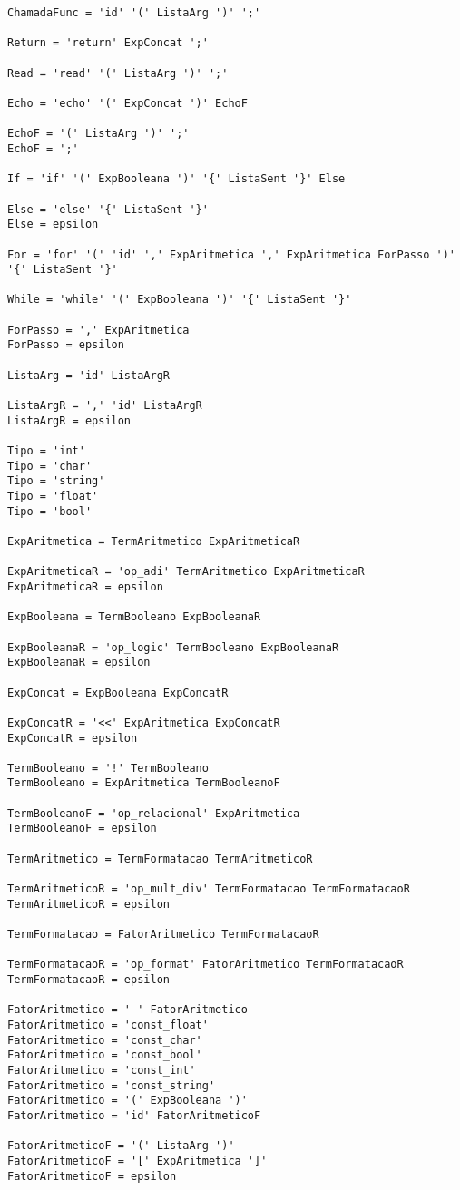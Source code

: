 \documentclass[
  12pt,				%
  oneside,			%
  a4paper,			%
  english,			%
  french,				%
  spanish,			%
  brazil,				%
]{abntex2}
\begin{document}
\begin{lstlisting}[label={code:gramatica-original},caption={Gramática
    original da linguagem de programação LisC.},style={mystyle}]
ChamadaFunc = 'id' '(' ListaArg ')' ';'

Return = 'return' ExpConcat ';'

Read = 'read' '(' ListaArg ')' ';'

Echo = 'echo' '(' ExpConcat ')' EchoF

EchoF = '(' ListaArg ')' ';'
EchoF = ';'

If = 'if' '(' ExpBooleana ')' '{' ListaSent '}' Else

Else = 'else' '{' ListaSent '}'
Else = epsilon

For = 'for' '(' 'id' ',' ExpAritmetica ',' ExpAritmetica ForPasso ')' '{' ListaSent '}'

While = 'while' '(' ExpBooleana ')' '{' ListaSent '}'

ForPasso = ',' ExpAritmetica
ForPasso = epsilon

ListaArg = 'id' ListaArgR

ListaArgR = ',' 'id' ListaArgR
ListaArgR = epsilon

Tipo = 'int'
Tipo = 'char'
Tipo = 'string'
Tipo = 'float'
Tipo = 'bool'

ExpAritmetica = TermAritmetico ExpAritmeticaR

ExpAritmeticaR = 'op_adi' TermAritmetico ExpAritmeticaR
ExpAritmeticaR = epsilon

ExpBooleana = TermBooleano ExpBooleanaR

ExpBooleanaR = 'op_logic' TermBooleano ExpBooleanaR
ExpBooleanaR = epsilon

ExpConcat = ExpBooleana ExpConcatR

ExpConcatR = '<<' ExpAritmetica ExpConcatR
ExpConcatR = epsilon

TermBooleano = '!' TermBooleano
TermBooleano = ExpAritmetica TermBooleanoF

TermBooleanoF = 'op_relacional' ExpAritmetica
TermBooleanoF = epsilon

TermAritmetico = TermFormatacao TermAritmeticoR

TermAritmeticoR = 'op_mult_div' TermFormatacao TermFormatacaoR
TermAritmeticoR = epsilon

TermFormatacao = FatorAritmetico TermFormatacaoR

TermFormatacaoR = 'op_format' FatorAritmetico TermFormatacaoR
TermFormatacaoR = epsilon

FatorAritmetico = '-' FatorAritmetico
FatorAritmetico = 'const_float'
FatorAritmetico = 'const_char'
FatorAritmetico = 'const_bool'
FatorAritmetico = 'const_int'
FatorAritmetico = 'const_string'
FatorAritmetico = '(' ExpBooleana ')'
FatorAritmetico = 'id' FatorAritmeticoF

FatorAritmeticoF = '(' ListaArg ')'
FatorAritmeticoF = '[' ExpAritmetica ']'
FatorAritmeticoF = epsilon

\end{lstlisting}
\end{document}
